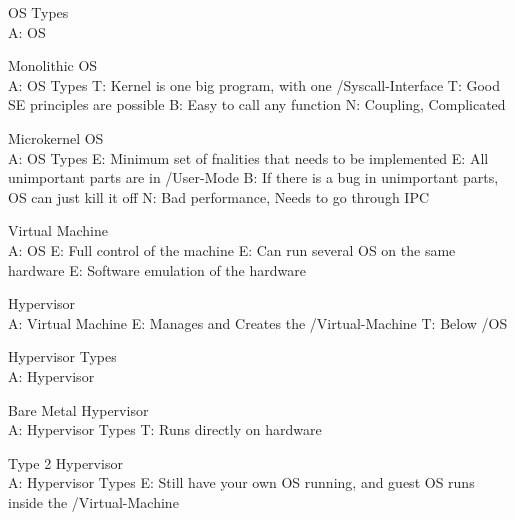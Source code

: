 \documentclass{article}
\begin{document}
OS Types\\
A: OS

Monolithic OS\\
A: OS Types
T: Kernel is one big program, with one /Syscall-Interface
T: Good SE principles are possible
B: Easy to call any function
N: Coupling, Complicated

Microkernel OS\\
A: OS Types
E: Minimum set of fnalities that needs to be implemented
E: All unimportant parts are in /User-Mode
B: If there is a bug in unimportant parts, OS can just kill it off
N: Bad performance, Needs to go through IPC

Virtual Machine\\
A: OS
E: Full control of the machine
E: Can run several OS on the same hardware
E: Software emulation of the hardware

Hypervisor\\
A: Virtual Machine
E: Manages and Creates the /Virtual-Machine
T: Below /OS

Hypervisor Types\\
A: Hypervisor

Bare Metal Hypervisor\\
A: Hypervisor Types
T: Runs directly on hardware

Type 2 Hypervisor\\
A: Hypervisor Types
E: Still have your own OS running, and guest OS runs inside the /Virtual-Machine
\end{document}
